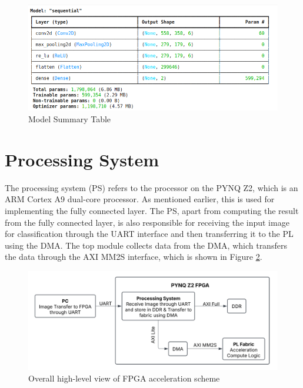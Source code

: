     \begin{figure}[H]
    \centering
    \includegraphics[width=\textwidth]{images/model_summary.png}
    \caption{Model Summary Table}
    \label{fig:model_summary}
    \end{figure}

    \section{Processing System}
    \noindent
    The processing system (PS) refers to the processor on the PYNQ Z2, which is an ARM Cortex A9 dual-core processor. As mentioned earlier, this is used for implementing the fully connected layer. The PS, apart from computing the result from the fully connected layer, is also responsible for receiving the input image for classification through the UART interface and then transferring it to the PL using the DMA. The top module collects data from the DMA, which transfers the data through the AXI MM2S interface, which is shown in Figure \ref{fig:overall_block}.

    \begin{figure}[H]
    \centering
    \includegraphics[width=\textwidth]{images/OverallBlockDiagram.png}
    \caption{Overall high-level view of FPGA acceleration scheme}
    \label{fig:overall_block}
    \end{figure}

